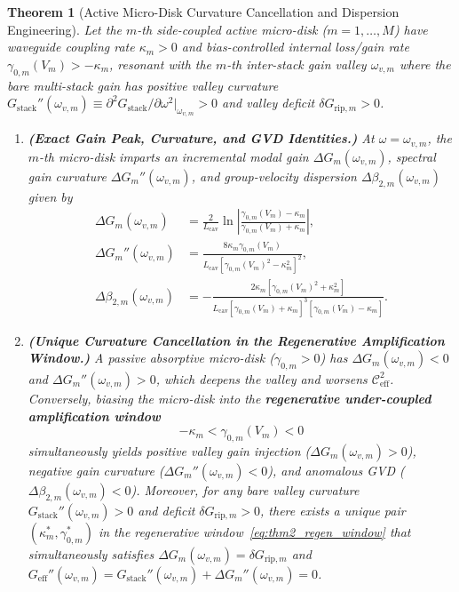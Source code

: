 \documentclass[11pt,letterpaper]{article}
\newtheorem{theorem}{Theorem}
\begin{document}
\begin{theorem}[Active Micro-Disk Curvature Cancellation and Dispersion Engineering]
\label{thm:microdisk}
Let the $m$-th side-coupled active micro-disk ($m = 1, \dots, M$) have waveguide coupling rate $\kappa_m > 0$ and bias-controlled internal loss/gain rate $\gamma_{0,m}(V_m) > -\kappa_m$, resonant with the $m$-th inter-stack gain valley $\omega_{v,m}$ where the bare multi-stack gain has positive valley curvature $G_{\mathrm{stack}}''(\omega_{v,m}) \equiv \partial^2 G_{\mathrm{stack}}/\partial\omega^2|_{\omega_{v,m}} > 0$ and valley deficit $\delta G_{\mathrm{rip},m} > 0$.
\begin{enumerate}
    \item[(a)] \textbf{(Exact Gain Peak, Curvature, and GVD Identities.)} At $\omega = \omega_{v,m}$, the $m$-th micro-disk imparts an incremental modal gain $\Delta G_m(\omega_{v,m})$, spectral gain curvature $\Delta G_m''(\omega_{v,m})$, and group-velocity dispersion $\Delta\beta_{2,m}(\omega_{v,m})$ given by
    \begin{subequations}
    \label{eq:thm2_identities}
    \begin{align}
    \Delta G_m(\omega_{v,m}) &= \frac{2}{L_{\mathrm{cav}}}\ln\!\left|\frac{\gamma_{0,m}(V_m) - \kappa_m}{\gamma_{0,m}(V_m) + \kappa_m}\right|, \label{eq:thm2_gain}\\
    \Delta G_m''(\omega_{v,m}) &= \frac{8 \kappa_m \gamma_{0,m}(V_m)}{L_{\mathrm{cav}}\left[\gamma_{0,m}(V_m)^2 - \kappa_m^2\right]^2}, \label{eq:thm2_curv}\\
    \Delta\beta_{2,m}(\omega_{v,m}) &= -\frac{2\kappa_m\left[\gamma_{0,m}(V_m)^2 + \kappa_m^2\right]}{L_{\mathrm{cav}}\left[\gamma_{0,m}(V_m) + \kappa_m\right]^3 \left[\gamma_{0,m}(V_m) - \kappa_m\right]}. \label{eq:thm2_gvd}
    \end{align}
    \end{subequations}
    \item[(b)] \textbf{(Unique Curvature Cancellation in the Regenerative Amplification Window.)} A passive absorptive micro-disk ($\gamma_{0,m} > 0$) has $\Delta G_m(\omega_{v,m}) < 0$ and $\Delta G_m''(\omega_{v,m}) > 0$, which deepens the valley and worsens $\mathcal{C}_{\mathrm{eff}}^2$. Conversely, biasing the micro-disk into the \textbf{regenerative under-coupled amplification window}
    \begin{equation}
    -\kappa_m < \gamma_{0,m}(V_m) < 0
    \label{eq:thm2_regen_window}
    \end{equation}
    simultaneously yields positive valley gain injection ($\Delta G_m(\omega_{v,m}) > 0$), negative gain curvature ($\Delta G_m''(\omega_{v,m}) < 0$), and anomalous GVD ($\Delta\beta_{2,m}(\omega_{v,m}) < 0$). Moreover, for any bare valley curvature $G_{\mathrm{stack}}''(\omega_{v,m}) > 0$ and deficit $\delta G_{\mathrm{rip},m} > 0$, there exists a unique pair $(\kappa_m^*, \gamma_{0,m}^*)$ in the regenerative window~\eqref{eq:thm2_regen_window} that simultaneously satisfies $\Delta G_m(\omega_{v,m}) = \delta G_{\mathrm{rip},m}$ and $G_{\mathrm{eff}}''(\omega_{v,m}) = G_{\mathrm{stack}}''(\omega_{v,m}) + \Delta G_m''(\omega_{v,m}) = 0$.
\end{enumerate}
\end{theorem}
\end{document}
